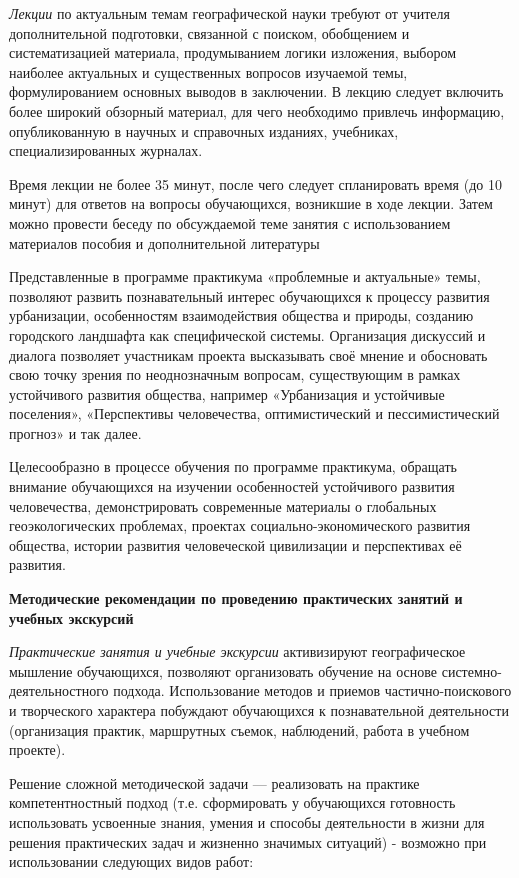 \documentclass[
  11pt,
]{book}
\begin{document}
\emph{Лекции} по актуальным темам географической науки требуют от учителя дополнительной подготовки, связанной с поиском, обобщением и систематизацией материала, продумыванием логики изложения, выбором наиболее актуальных и существенных вопросов изучаемой темы, формулированием основных выводов в заключении. В лекцию следует включить более широкий обзорный материал, для чего необходимо привлечь информацию, опубликованную в научных и справочных изданиях, учебниках, специализированных журналах.

Время лекции не более 35 минут, после чего следует спланировать время (до 10 минут) для ответов на вопросы обучающихся, возникшие в ходе лекции. Затем можно провести беседу по обсуждаемой теме занятия с использованием материалов пособия и дополнительной литературы

Представленные в программе практикума «проблемные и актуальные» темы, позволяют развить познавательный интерес обучающихся к процессу развития урбанизации, особенностям взаимодействия общества и природы, созданию городского ландшафта как специфической системы. Организация дискуссий и диалога позволяет участникам проекта высказывать своё мнение и обосновать свою точку зрения по неоднозначным вопросам, существующим в рамках устойчивого развития общества, например «Урбанизация и устойчивые поселения», «Перспективы человечества, оптимистический и пессимистический прогноз» и так далее.

Целесообразно в процессе обучения по программе практикума, обращать внимание обучающихся на изучении особенностей устойчивого развития человечества, демонстрировать современные материалы о глобальных геоэкологических проблемах, проектах социально-экономического развития общества, истории развития человеческой циви­лизации и перспективах её развития.

\textbf{Методические рекомендации по проведению практических занятий и учебных экскурсий}

\emph{Практические занятия и учебные экскурсии} активизируют географическое мышление обучающихся, позволяют организовать обучение на основе системно-деятельностного подхода. Использование методов и приемов частично-поискового и творческого характера побуждают обучающихся к познавательной деятельности (организация практик, маршрутных съемок, наблюдений, работа в учебном проекте).

Решение сложной методической задачи --- реализовать на практике компетентностный подход (т.е. сформировать у обучающихся готовность использовать усвоенные знания, умения и способы деятельности в жизни для решения практических задач и жизненно значимых ситуаций) - возможно при использовании следующих видов работ:
\end{document}
